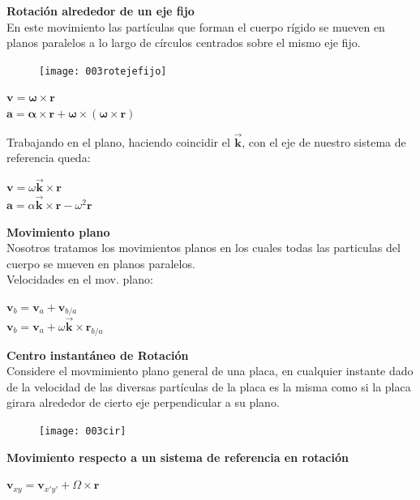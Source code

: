 \documentclass[11pt,a4paper,twocolumn]{article}
\newcommand{\vc}[1]{\textbf{#1}}
\newcommand{\vcs}[1]{\boldsymbol{#1}}
\begin{document}
	\textbf{Rotación alrededor de un eje fijo}\\
	En este movimiento las partículas que forman el cuerpo rígido se mueven en planos paralelos a lo largo de círculos centrados sobre el mismo eje fijo.\\
	\begin{figure}[ht]
		\centering
		\texttt{[image: 003rotejefijo]}
	\end{figure}

	\begin{center}
		$\vc{v}=\vcs{\omega}\times\vc{r}$\\
		$\vc{a}=\vcs{\alpha}\times\vc{r}+\vcs{\omega}\times(\vcs{\omega}\times\vc{r})$\\
	\end{center}

	\noindent Trabajando en el plano, haciendo coincidir el $\vec{\vc{k}}$, con el eje de nuestro sistema de referencia queda:
	\begin{center}
	$\vc{v}=\omega\vec{\vc{k}}\times\vc{r}$\\
	$\vc{a}=\alpha\vec{\vc{k}}\times\vc{r}-\omega^{2}\vc{r}$\\	
	\end{center}	

	\textbf{Movimiento plano}\\
	Nosotros tratamos los movimientos planos en los cuales todas las particulas del cuerpo se mueven en planos paralelos.\\
	Velocidades en el mov. plano:

	\begin{center}
		$\vc{v}_{b}=\vc{v}_{a} + \vc{v}_{b/a}$\\
		$\vc{v}_{b}=\vc{v}_{a}+\omega\vec{\vc{k}}\times\vc{r}_{b/a}$

	\end{center}

	\textbf{Centro instantáneo de Rotación}\\
	Considere el movmimiento plano general de una placa, en cualquier instante dado de la velocidad de las diversas partículas de la placa es la misma como si la placa girara alrededor de cierto eje perpendicular a su plano.\\
	\begin{figure}[ht]
		\centering
		\texttt{[image: 003cir]}
	\end{figure}


	\textbf{Movimiento respecto a un sistema de referencia en rotación}\\
	\begin{center}
		$\vc{v}_{xy}=\vc{v}_{x'y'} + \Omega \times \vc{r}$\\
	\end{center}
\end{document}
